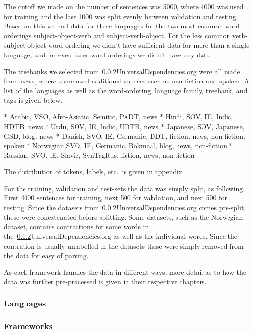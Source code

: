 {The cutoff we made on the number of sentences was 5000, where 4000 was used for
training and the last 1000 was split evenly between validation and testing.
Based on this we had data for three languages for the two most common word
orderings subject-object-verb and subject-verb-object. For the less common
verb-subject-object word ordering we didn't have sufficient data for more than a
single language, and for even rarer word orderings we didn't have any data.

The treebanks we selected from~\ref{}{UniversalDependencies.org} were all made
from news, where some used additional sources such as non-fiction and spoken. A
list of the languages as well as the word-ordering, language family, treebank,
and tags is given below.

* Arabic,   VSO, Afro-Asiatic, Semitic, PADT, news
* Hindi,    SOV, IE, Indic,             HDTB, news
* Urdu,     SOV, IE, Indic,             UDTB, news
* Japanese, SOV, Japanese,              GSD, blog, news
* Danish,   SVO, IE, Germanic,          DDT, fiction, news, non-fiction, spoken
* Norwegian,SVO, IE, Germanic,          Bokmaal, blog, news, non-fiction
* Russian,  SVO, IE, Slavic,            SynTagRus, fiction, news, non-fiction

The distribution of tokens, labels, etc.\ is given in appendix.

For the training, validation and test-sets the data was simply split, as
following. First 4000 sentences for training, next 500 for validation, and next
500 for testing. Since the datasets from~\ref{}{UniversalDependencies.org} comes
pre-split, these were concatenated before splitting. Some datasets, such as the
Norwegian dataset, contains contractions for some words in
the~\ref{}{UniversalDependencies.org} as well as the individual words. Since the
contration is usually unlabelled in the datasets these were simply removed from
the data for easy of parsing.

As each framework handles the data in different ways, more detail as to how the
data was further pre-processed is given in their respective chapters.


\subsubsection{Languages}


\subsubsection{Frameworks}

}
